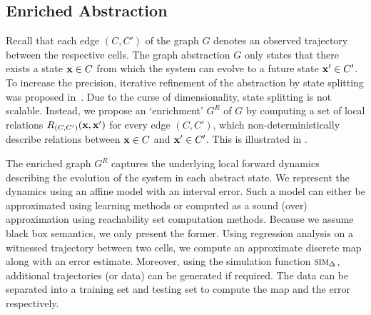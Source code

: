 


\subsection{Enriched Abstraction}



Recall that each edge $(C,C')$ of the graph $G$ denotes an observed
trajectory between the respective cells. The graph abstraction $G$
only states that there exists a state $\mathbf{x} \in C$ from which the system
can evolve to a future state $\mathbf{x}' \in C'$. To increase the precision,
iterative refinement of the abstraction by state splitting was
proposed in~\cite{zutshi2014multiple}. Due to the curse of
dimensionality, state splitting is not scalable. Instead, we propose
an `enrichment' $G^R$ of $G$ by computing a set of local relations
$R_{(C,C')}(\mathbf{x},\mathbf{x}')$ for every edge $(C,C')$, which
non-deterministically describe relations between $\mathbf{x} \in C$ and $\mathbf{x}'
\in C'$. This is illustrated in .

The enriched graph $G^R$ captures the underlying local forward
dynamics describing the evolution of the system in each abstract
state. We represent the dynamics using an affine model with an
interval error. Such a model can either be approximated using learning
methods or computed as a sound (over) approximation using reachability
set computation methods. Because we assume black box semantics, we
only present the former. Using regression analysis on a witnessed trajectory between two cells,
we compute an approximate discrete map along with an error estimate.
Moreover, using the simulation function $\mbox{\sc sim}_\Delta$, additional
trajectories (or data) can be generated if required. The data
can be separated into a training set and testing set to compute the
map and the error respectively.

